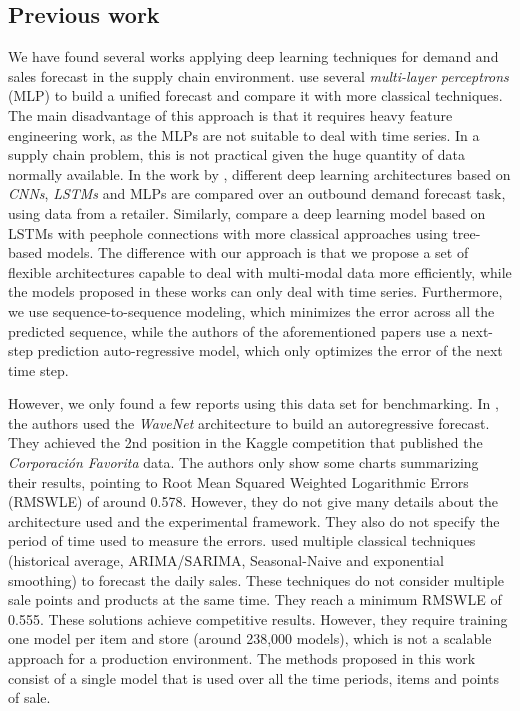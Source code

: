 \subsection{Previous work}	\label{sec:salesforecast_prevwork}
We have found several works applying deep learning techniques for demand and sales forecast in the supply chain environment. \autocite{Kilimci2019} use several \textit{multi-layer perceptrons} (MLP) to build a unified forecast and compare it with more classical techniques. The main disadvantage of this approach is that it requires heavy feature engineering work, as the MLPs are not suitable to deal with time series. In a supply chain problem, this is not practical given the huge quantity of data normally available. In the work by \autocite{Talupula2018}, different deep learning architectures based on \textit{CNNs}, \textit{LSTMs} and MLPs are compared over an outbound demand forecast task, using data from a retailer. Similarly, \autocite{Helmini2019} compare a deep learning model based on LSTMs with peephole connections with more classical approaches using tree-based models.  The difference with our approach is that we propose a set of flexible architectures capable to deal with multi-modal data more efficiently, while the models proposed in these works can only deal with time series. Furthermore, we use sequence-to-sequence modeling, which minimizes the error across all the predicted sequence, while the authors of the aforementioned papers use a next-step prediction auto-regressive model, which only optimizes the error of the next time step.

However, we only found a few reports using this data set for benchmarking. In \autocite{kechyn2018}, the authors used the \textit{WaveNet} \autocite{vanderoord2016} architecture to build an autoregressive forecast. They achieved the 2nd position in the Kaggle competition that published the \textit{Corporación Favorita} data. The authors only show some charts summarizing their results, pointing to Root Mean Squared Weighted Logarithmic Errors (RMSWLE) of around 0.578. However, they do not give many details about the architecture used and the experimental framework. They also do not specify the period of time used to measure the errors. \autocite{Steves2018} used multiple classical techniques (historical average, ARIMA/SARIMA, Seasonal-Naive and exponential smoothing) to forecast the daily sales. These techniques do not consider multiple sale points and products at the same time. They reach a minimum RMSWLE of 0.555. These solutions achieve competitive results. However, they require training one model per item and store (around 238,000 models), which is not a scalable approach for a production environment. The methods proposed in this work consist of a single model that is used over all the time periods, items and points of sale.

